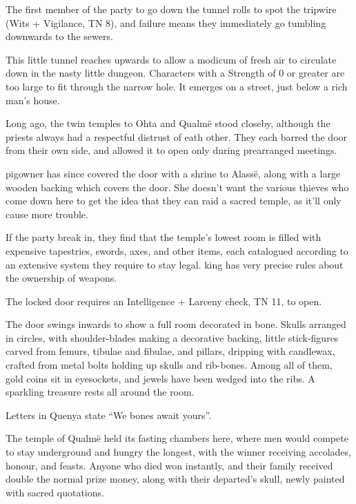 The first member of the party to go down the tunnel rolls to spot the tripwire (Wits + Vigilance, TN 8), and failure means they immediately go tumbling downwards to the sewers.

This little tunnel reaches upwards to allow a modicum of fresh air to circulate down in the nasty little dungeon.  Characters with a Strength of 0 or greater are too large to fit through the narrow hole.  It emerges on a street, just below a rich man's house.

Long ago, the twin temples to Ohta and Qualm\"{e} stood closeby, although the priests always had a respectful distrust of eath other.  They each barred the door from their own side, and allowed it to open only during prearranged meetings.

\Gls{pigowner} has since covered the door with a shrine to Alass\"{e}, along with a large wooden backing which covers the door.  She doesn't want the various thieves who come down here to get the idea that they can raid a sacred temple, as it'll only cause more trouble.

If the party break in, they find that the temple's lowest room is filled with expensive tapestries, swords, axes, and other items, each catalogued according to an extensive system they require to stay legal.  \Gls{king} has very precise rules about the ownership of weapons.

The locked door requires an Intelligence + Larceny check, TN 11, to open.

\begin{boxtext}
	The door swings inwards to show a full room decorated in bone.  Skulls arranged in circles, with shoulder-blades making a decorative backing, little stick-figures carved from femurs, tibulae and fibulae, and pillars, dripping with candlewax, crafted from metal bolts holding up skulls and rib-bones.  Among all of them, gold coins sit in eyesockets, and jewels have been wedged into the ribs.  A sparkling treasure rests all around the room.

	Letters in Quenya state ``We bones await yours''.
\end{boxtext}

The temple of Qualm\"{e} held its fasting chambers here, where men would compete to stay underground and hungry the longest, with the winner receiving accolades, honour, and feasts.  Anyone who died won instantly, and their family received double the normal prize money, along with their departed's skull, newly painted with sacred quotations.

